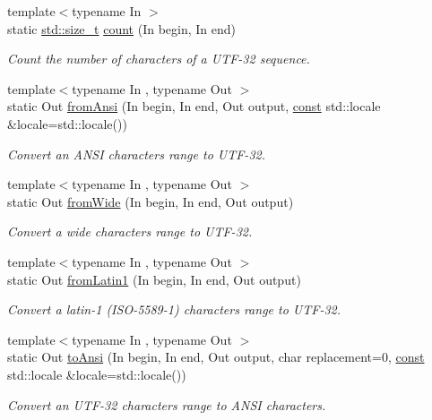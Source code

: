 \begin{DoxyCompactItemize}
{\footnotesize template$<$typename In $>$ }\\static \hyperlink{nc__alloc_8h_a7b60c5629e55e8ec87a4547dd4abced4}{std\-::size\-\_\-t} \hyperlink{classsf_1_1_utf_3_0132_01_4_a9b18c32b9e6d4b3126e9b4af45988b55}{count} (In begin, In end)
\begin{DoxyCompactList}\small\item\em Count the number of characters of a U\-T\-F-\/32 sequence. \end{DoxyCompactList}\item 
{\footnotesize template$<$typename In , typename Out $>$ }\\static Out \hyperlink{classsf_1_1_utf_3_0132_01_4_a384a4169287af15876783ad477cac4e3}{from\-Ansi} (In begin, In end, Out output, \hyperlink{term__entry_8h_a57bd63ce7f9a353488880e3de6692d5a}{const} std\-::locale \&locale=std\-::locale())
\begin{DoxyCompactList}\small\item\em Convert an A\-N\-S\-I characters range to U\-T\-F-\/32. \end{DoxyCompactList}\item 
{\footnotesize template$<$typename In , typename Out $>$ }\\static Out \hyperlink{classsf_1_1_utf_3_0132_01_4_abdf0d41e0c8814a68326688e3b8d187f}{from\-Wide} (In begin, In end, Out output)
\begin{DoxyCompactList}\small\item\em Convert a wide characters range to U\-T\-F-\/32. \end{DoxyCompactList}\item 
{\footnotesize template$<$typename In , typename Out $>$ }\\static Out \hyperlink{classsf_1_1_utf_3_0132_01_4_a05741b76b5a26267a72735e40ca61c55}{from\-Latin1} (In begin, In end, Out output)
\begin{DoxyCompactList}\small\item\em Convert a latin-\/1 (I\-S\-O-\/5589-\/1) characters range to U\-T\-F-\/32. \end{DoxyCompactList}\item 
{\footnotesize template$<$typename In , typename Out $>$ }\\static Out \hyperlink{classsf_1_1_utf_3_0132_01_4_a768cb205f7f1d20cd900e34fb48f9316}{to\-Ansi} (In begin, In end, Out output, char replacement=0, \hyperlink{term__entry_8h_a57bd63ce7f9a353488880e3de6692d5a}{const} std\-::locale \&locale=std\-::locale())
\begin{DoxyCompactList}\small\item\em Convert an U\-T\-F-\/32 characters range to A\-N\-S\-I characters. \end{DoxyCompactList}\item 

\end{DoxyCompactItemize}
